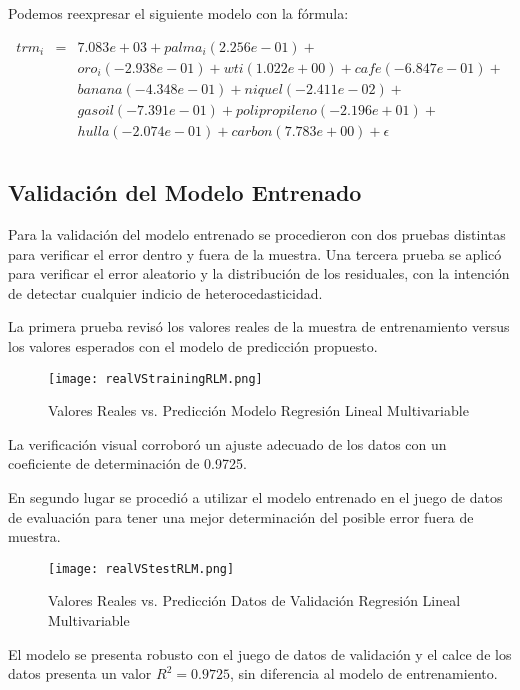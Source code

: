 Podemos reexpresar el siguiente modelo con la fórmula:

\begin{eqnarray*}
    trm_i & = & 7.083e+03 + palma_i(2.256e-01) + \\
& & oro_i(-2.938e-01) + wti(1.022e+00) + cafe(-6.847e-01) +  \\
& & banana(-4.348e-01) + niquel(-2.411e-02) + \\
& & gasoil(-7.391e-01) + polipropileno(-2.196e+01) + \\
& & hulla(-2.074e-01) + carbon(7.783e+00) + \epsilon \\
\end{eqnarray*}

\subsection{Validación del Modelo Entrenado}
Para la validación del modelo entrenado se procedieron con dos pruebas distintas para verificar el error dentro y fuera de la muestra. Una tercera prueba se aplicó para verificar el error aleatorio y la distribución de los residuales, con la intención de detectar cualquier indicio de heterocedasticidad.

La primera prueba revisó los valores reales de la muestra de entrenamiento versus los valores esperados con el modelo de predicción propuesto.

\begin{figure}[H]
    \centering
    \texttt{[image: realVStrainingRLM.png]}
    \caption{Valores Reales vs. Predicción Modelo Regresión Lineal Multivariable}
\end{figure}

La verificación visual corroboró un ajuste adecuado de los datos con un coeficiente de determinación de 0.9725.

En segundo lugar se procedió a utilizar el modelo entrenado en el juego de datos de evaluación para tener una mejor determinación del posible error fuera de muestra.

\begin{figure}[H]
    \centering
    \texttt{[image: realVStestRLM.png]}
    \caption{Valores Reales vs. Predicción Datos de Validación Regresión Lineal Multivariable}
\end{figure}

El modelo se presenta robusto con el juego de datos de validación y el calce de los datos presenta un valor $R^2 = 0.9725$, sin diferencia al modelo de entrenamiento.


